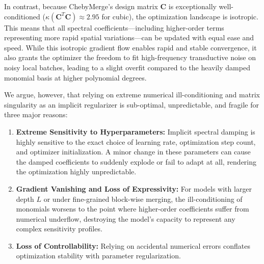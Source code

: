 In contrast, because ChebyMerge's design matrix $\mathbf{C}$ is exceptionally well-conditioned ($\kappa(\mathbf{C}^T \mathbf{C}) \approx 2.95$ for cubic), the optimization landscape is isotropic. This means that all spectral coefficients---including higher-order terms representing more rapid spatial variations---can be updated with equal ease and speed. While this isotropic gradient flow enables rapid and stable convergence, it also grants the optimizer the freedom to fit high-frequency transductive noise on noisy local batches, leading to a slight overfit compared to the heavily damped monomial basis at higher polynomial degrees.

We argue, however, that relying on extreme numerical ill-conditioning and matrix singularity as an implicit regularizer is sub-optimal, unpredictable, and fragile for three major reasons:
\begin{enumerate}
    \item \textbf{Extreme Sensitivity to Hyperparameters:} Implicit spectral damping is highly sensitive to the exact choice of learning rate, optimization step count, and optimizer initialization. A minor change in these parameters can cause the damped coefficients to suddenly explode or fail to adapt at all, rendering the optimization highly unpredictable.
    \item \textbf{Gradient Vanishing and Loss of Expressivity:} For models with larger depth $L$ or under fine-grained block-wise merging, the ill-conditioning of monomials worsens to the point where higher-order coefficients suffer from numerical underflow, destroying the model's capacity to represent any complex sensitivity profiles.
    \item \textbf{Loss of Controllability:} Relying on accidental numerical errors conflates optimization stability with parameter regularization. 
\end{enumerate}

